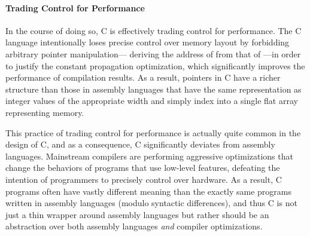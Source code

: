 

\paragraph{Trading Control for Performance}

In the course of doing so, C is effectively trading control for performance.  The C language
intentionally loses precise control over memory layout by forbidding arbitrary pointer
manipulation---\eg{} deriving the address of  from that of ---in order to
justify the constant propagation optimization, which significantly improves the performance of
compilation results.  As a result, pointers in C have a richer structure than those in assembly
languages that have the same representation as integer values of the appropriate width and simply
index into a single flat array representing memory.

This practice of trading control for performance is actually quite common in the design of C, and as
a consequence, C significantly deviates from assembly languages.  Mainstream compilers are
performing aggressive optimizations that change the behaviors of programs that use low-level
features, defeating the intention of programmers to precisely control over hardware.  As a result, C
programs often have vastly different meaning than the exactly same programs written in assembly
languages (modulo syntactic differences), and thus C is not just a thin wrapper around assembly
languages but rather should be an abstraction over both assembly languages \emph{and} compiler
optimizations.






